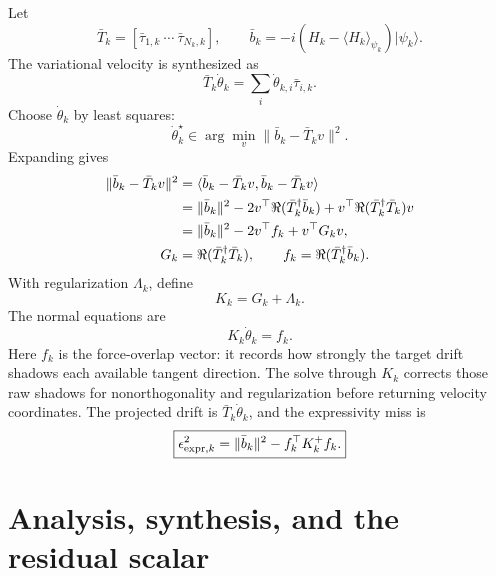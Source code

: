 \documentclass[10pt,twocolumn]{article}
\newcommand{\ket}[1]{\lvert #1\rangle}
\begin{document}
Let
\begin{equation}
\bar T_k=[\bar\tau_{1,k}\ \cdots\ \bar\tau_{N_k,k}],
\qquad
\bar b_k=-i(H_k-\langle H_k\rangle_{\psi_k})\ket{\psi_k}.
\label{eq:p2_Tb}
\end{equation}
The variational velocity is synthesized as
\begin{equation}
\bar T_k\dot\theta_k=\sum_i\dot\theta_{k,i}\bar\tau_{i,k}.
\label{eq:p2_velocity_synthesis}
\end{equation}
Choose \(\dot\theta_k\) by least squares:
\begin{equation}
\dot\theta_k^\star\in\arg\min_v\|\bar b_k-\bar T_kv\|^2.
\label{eq:p2_ls}
\end{equation}
Expanding gives
\begin{align}
\|\bar b_k-\bar T_kv\|^2
&=\langle \bar b_k-\bar T_kv,\bar b_k-\bar T_kv\rangle
\notag\\
&=\|\bar b_k\|^2
-2v^\top\Re(\bar T_k^\dagger\bar b_k)
+v^\top\Re(\bar T_k^\dagger\bar T_k)v
\notag\\
&=\|\bar b_k\|^2-2v^\top f_k+v^\top G_kv,
\label{eq:p2_expand}\\
G_k&=\Re(\bar T_k^\dagger\bar T_k),
\qquad
f_k=\Re(\bar T_k^\dagger\bar b_k).
\label{eq:p2_Gf}
\end{align}
With regularization \(\Lambda_k\), define
\begin{equation}
K_k=G_k+\Lambda_k.
\label{eq:p2_K}
\end{equation}
The normal equations are
\begin{equation}
\boxed{K_k\dot\theta_k=f_k.}
\label{eq:p2_normal}
\end{equation}
Here \(f_k\) is the force-overlap vector: it records how strongly the target drift shadows each available tangent direction. The solve through \(K_k\) corrects those raw shadows for nonorthogonality and regularization before returning velocity coordinates.
The projected drift is \(\bar T_k\dot\theta_k\), and the expressivity miss is
\begin{equation}
\boxed{
\epsilon_{{\rm expr},k}^2
=\|\bar b_k\|^2-f_k^\top K_k^+f_k.
}
\label{eq:p2_expr_miss}
\end{equation}

\section{Analysis, synthesis, and the residual scalar}
\end{document}
